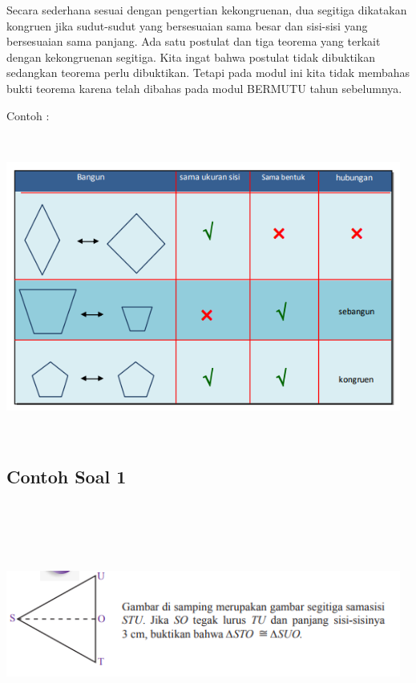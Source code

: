\documentclass[11pt,fleqn]{book} %
\begin{document}
Secara sederhana sesuai dengan pengertian kekongruenan, dua segitiga dikatakan kongruen jika sudut-sudut yang bersesuaian sama besar dan sisi-sisi yang bersesuaian sama panjang. Ada satu postulat dan tiga teorema yang  terkait dengan kekongruenan segitiga. Kita ingat bahwa postulat tidak dibuktikan sedangkan teorema perlu dibuktikan. Tetapi pada modul ini kita tidak membahas bukti teorema karena telah dibahas pada modul BERMUTU tahun sebelumnya. 

Contoh : 

\includegraphics[width = 13cm, height= 10cm]{Pictures/a26.png}

\subsection{Contoh Soal 1}
\includegraphics[width = 13cm, height= 8cm]{Pictures/a22.png}
\end{document}
